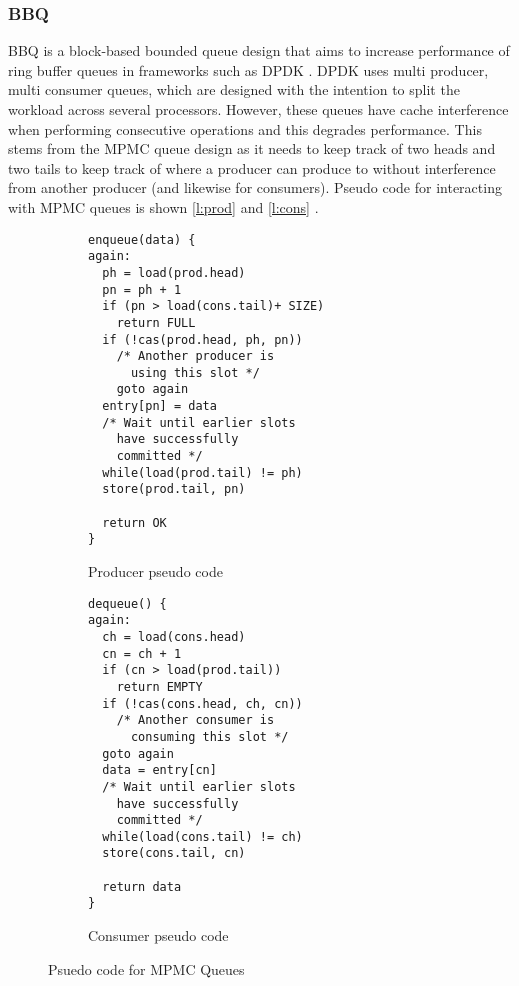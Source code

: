 \subsubsection{BBQ}
BBQ is a block-based bounded queue design that aims to increase performance of ring buffer queues in frameworks such
as DPDK \cite{Wang_BFOOLCHC_22}. DPDK uses multi producer, multi consumer queues, which are designed with the
intention to split the workload across several processors. However, these queues have cache interference when
performing consecutive operations and this degrades performance. This stems from the MPMC queue design as it needs to keep track of
two heads and two tails to keep track of where a producer can produce to without interference from another producer (and
likewise for consumers). Pseudo code for interacting with MPMC queues is shown \autoref{l:prod} and \autoref{l:cons} 
\cite{Wang_BFOOLCHC_22}.


\begin{figure} [H]
	\begin{multicols}{2}
		\begin{subfigure}{0.45\textwidth}
		\begin{verbatim}
enqueue(data) {
again:
  ph = load(prod.head)
  pn = ph + 1
  if (pn > load(cons.tail)+ SIZE)
    return FULL
  if (!cas(prod.head, ph, pn))
    /* Another producer is 
      using this slot */
    goto again
  entry[pn] = data
  /* Wait until earlier slots 
    have successfully
    committed */
  while(load(prod.tail) != ph)
  store(prod.tail, pn)

  return OK
}
    \end{verbatim}
    \caption{Producer pseudo code}
    \label{l:prod}
    \end{subfigure}

    \begin{subfigure}{0.45\textwidth}
    \begin{verbatim}
dequeue() {
again:
  ch = load(cons.head)
  cn = ch + 1
  if (cn > load(prod.tail))
    return EMPTY
  if (!cas(cons.head, ch, cn))
    /* Another consumer is 
      consuming this slot */
  goto again
  data = entry[cn]
  /* Wait until earlier slots 
    have successfully 
    committed */
  while(load(cons.tail) != ch)
  store(cons.tail, cn)

  return data
}
    \end{verbatim}
    \caption{Consumer pseudo code}
    \label{l:cons}
    \end{subfigure}
\end{multicols}
\caption{Psuedo code for MPMC Queues}
\label{l:mpmc}
\end{figure}


